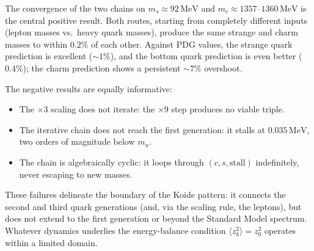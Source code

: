 \documentclass[12pt,a4paper]{article}
\newcommand{\MeV}{\,\text{MeV}}
\begin{document}
The convergence of the two chains on $m_s \approx 92\MeV$ and
$m_c \approx 1357\text{--}1360\MeV$ is the central positive result.
Both routes, starting from completely different inputs (lepton masses
vs.\ heavy quark masses), produce the same strange and charm masses
to within $0.2\%$ of each other. Against PDG values, the strange
quark prediction is excellent ($\sim 1\%$), and the bottom quark
prediction is even better ($0.4\%$); the charm prediction shows a
persistent $\sim 7\%$ overshoot.

The negative results are equally informative:
\begin{itemize}
\item The $\times 3$ scaling does not iterate: the $\times 9$ step
produces no viable triple.
\item The iterative chain does not reach the first generation: it
stalls at $0.035\MeV$, two orders of magnitude below $m_u$.
\item The chain is algebraically cyclic: it loops through
$(c, s, \text{stall})$ indefinitely, never escaping to new masses.
\end{itemize}
These failures delineate the boundary of the Koide pattern: it
connects the second and third quark generations (and, via the
scaling rule, the leptons), but does not extend to the first
generation or beyond the Standard Model spectrum. Whatever
dynamics underlies the energy-balance condition
$\langle z_k^2\rangle = z_0^2$ operates within a limited domain.
\end{document}
